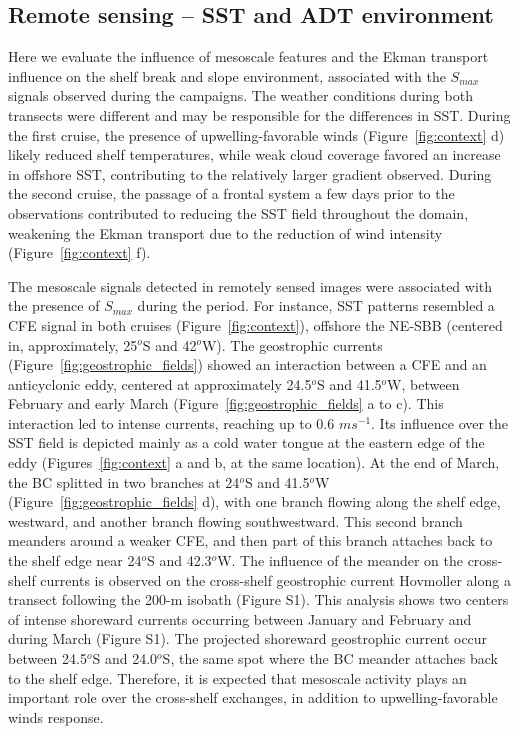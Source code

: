 \documentclass[draft]{agujournal2019}
\begin{document}
\subsection{Remote sensing -- SST and ADT environment}
\label{subsec:remote_sensing}

Here we evaluate the influence of mesoscale features and the Ekman transport influence on the shelf break and slope environment, associated with the \textit{$S_{max}$} signals observed during the campaigns. The weather conditions during both transects were different and may be responsible for the differences in SST. During the first cruise, the presence of upwelling-favorable winds (Figure~\ref{fig:context} d) likely reduced shelf temperatures, while weak cloud coverage favored an increase in offshore SST, contributing to the relatively larger gradient observed. During the second cruise, the passage of a frontal system a few days prior to the observations contributed to reducing the SST field throughout the domain, weakening the Ekman transport due to the reduction of wind intensity (Figure~\ref{fig:context} f).

The mesoscale signals detected in remotely sensed images were associated with the presence of \textit{$S_{max}$} during the period. For instance, SST patterns resembled a CFE signal in both cruises (Figure~\ref{fig:context}), offshore the NE-SBB (centered in, approximately, 25$^o$S and 42$^o$W). The geostrophic currents (Figure~\ref{fig:geostrophic_fields}) showed an interaction between a CFE and an anticyclonic eddy, centered at approximately 24.5$^o$S and 41.5$^o$W, between February and early March (Figure~\ref{fig:geostrophic_fields} a to c). This interaction led to intense currents, reaching up to 0.6 $m s^{-1}$. Its influence over the SST field is depicted mainly as a cold water tongue at the eastern edge of the eddy (Figures~\ref{fig:context} a and b, at the same location). At the end of March, the BC splitted in two branches at 24$^o$S and 41.5$^o$W (Figure~\ref{fig:geostrophic_fields} d), with one branch flowing along the shelf edge, westward, and another branch flowing southwestward. This second branch meanders around a weaker CFE, and then part of this branch attaches back to the shelf edge near 24$^o$S and 42.3$^o$W. The influence of the meander on the cross-shelf currents is observed on the cross-shelf geostrophic current Hovmoller along a transect following the 200-m isobath (Figure S1). This analysis shows two centers of intense shoreward currents occurring between January and February and during March (Figure S1). The projected shoreward geostrophic current occur between 24.5$^o$S and 24.0$^o$S, the same spot where the BC meander attaches back to the shelf edge. Therefore, it is expected that mesoscale activity plays an important role over the cross-shelf exchanges, in addition to upwelling-favorable winds response.
\end{document}
